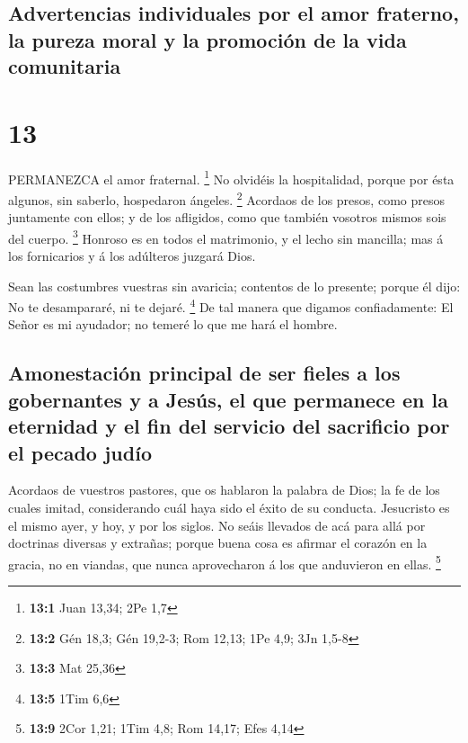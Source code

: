 \hypertarget{advertencias-individuales-por-el-amor-fraterno-la-pureza-moral-y-la-promociuxf3n-de-la-vida-comunitaria}{%
\subsection{Advertencias individuales por el amor fraterno, la pureza
moral y la promoción de la vida
comunitaria}\label{advertencias-individuales-por-el-amor-fraterno-la-pureza-moral-y-la-promociuxf3n-de-la-vida-comunitaria}}

\hypertarget{section-12}{%
\section{13}\label{section-12}}

 PERMANEZCA el amor fraternal. \footnote{\textbf{13:1} Juan
  13,34; 2Pe 1,7}  No olvidéis la hospitalidad, porque por
ésta algunos, sin saberlo, hospedaron ángeles. \footnote{\textbf{13:2}
  Gén 18,3; Gén 19,2-3; Rom 12,13; 1Pe 4,9; 3Jn 1,5-8} 
Acordaos de los presos, como presos juntamente con ellos; y de los
afligidos, como que también vosotros mismos sois del cuerpo. \footnote{\textbf{13:3}
  Mat 25,36}  Honroso es en todos el matrimonio, y el lecho
sin mancilla; mas á los fornicarios y á los adúlteros juzgará Dios.

 Sean las costumbres vuestras sin avaricia; contentos de lo
presente; porque él dijo: No te desampararé, ni te dejaré. \footnote{\textbf{13:5}
  1Tim 6,6}  De tal manera que digamos confiadamente: El
Señor es mi ayudador; no temeré lo que me hará el hombre.

\hypertarget{amonestaciuxf3n-principal-de-ser-fieles-a-los-gobernantes-y-a-jesuxfas-el-que-permanece-en-la-eternidad-y-el-fin-del-servicio-del-sacrificio-por-el-pecado-juduxedo}{%
\subsection{Amonestación principal de ser fieles a los gobernantes y a
Jesús, el que permanece en la eternidad y el fin del servicio del
sacrificio por el pecado
judío}\label{amonestaciuxf3n-principal-de-ser-fieles-a-los-gobernantes-y-a-jesuxfas-el-que-permanece-en-la-eternidad-y-el-fin-del-servicio-del-sacrificio-por-el-pecado-juduxedo}}

 Acordaos de vuestros pastores, que os hablaron la palabra
de Dios; la fe de los cuales imitad, considerando cuál haya sido el
éxito de su conducta.  Jesucristo es el mismo ayer, y hoy, y
por los siglos.  No seáis llevados de acá para allá por
doctrinas diversas y extrañas; porque buena cosa es afirmar el corazón
en la gracia, no en viandas, que nunca aprovecharon á los que anduvieron
en ellas. \footnote{\textbf{13:9} 2Cor 1,21; 1Tim 4,8; Rom 14,17; Efes
  4,14}

